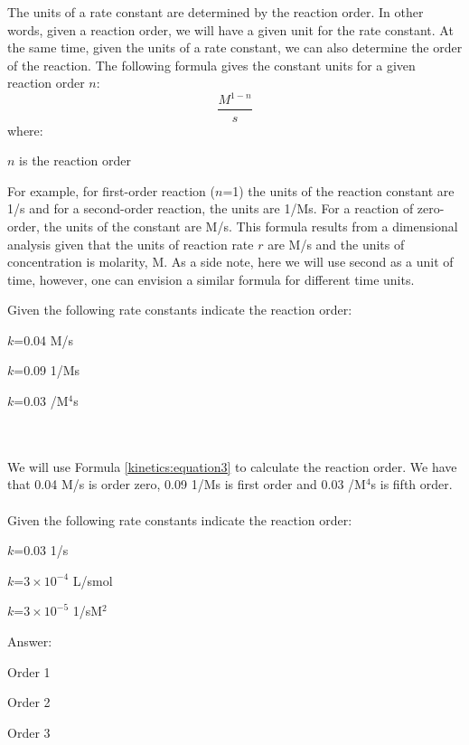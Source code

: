 \documentclass[main.tex]{subfiles}
\newcommand\chapterlabel{kinetics}
\begin{document}
\begin{description}
The units of a rate constant are determined by the reaction order. In other words, given a reaction order, we will have a given unit for the rate constant. At the same time, given the units of a rate constant, we can also determine the order of the reaction. The following formula gives the constant units for a given reaction order $n$:
\begin{equation}
\boxed{\frac{M^{1-n}}{s} }
\label{\chapterlabel:equation3}
\end{equation}
where:
\begin{where}
 \item $n$   is the reaction order
\end{where}
For example, for first-order reaction ($n$=1) the units of the reaction constant are 1/s and for a second-order reaction, the units are 1/Ms. For a reaction of zero-order, the units of the constant are M/s. This formula results from a dimensional analysis given that the units of reaction rate $r$ are M/s and the units of concentration is molarity, M. As a side note, here we will use second as a unit of time, however, one can envision a similar formula for different time units.
\begin{example} %
Given the following rate constants indicate the reaction order:
\begin{inparaenum}[(a)]	
\item  $k$=0.04 M/s
\item	 $k$=0.09 1/Ms 
\item  $k$=0.03 /M$^4$s
\end{inparaenum} \\
\\
We will use Formula \ref{\chapterlabel:equation3} to calculate the reaction order. We have that 0.04 M/s is order zero, 0.09 1/Ms is first order and 0.03 /M$^4$s is fifth order.
\\\faDiamond\ \\
Given the following rate constants indicate the reaction order:
\begin{inparaenum}[(a)]	
\item $k$=0.03 1/s
\item	 $k$=$3\times 10^{-4}$ L/smol
\item  $k$=$3\times 10^{-5}$ 1/sM$^2$
\end{inparaenum} 
\flushright Answer:   
\begin{inparaenum}[(a)]	
\item Order 1
\item	 Order 2
\item  Order 3
\end{inparaenum}
\end{example}%


\end{description}
\end{document}
